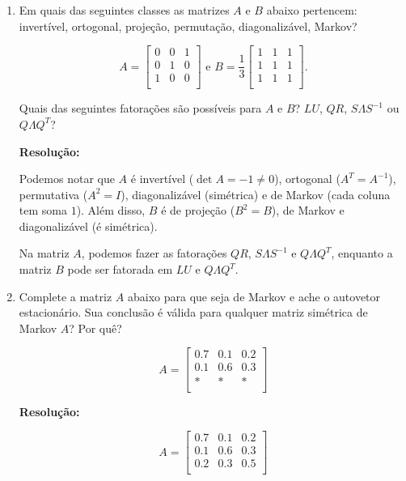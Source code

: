 \documentclass[leqno]{article}
\begin{document}
\begin{enumerate}
    \item Em quais das seguintes classes as matrizes $A$ e $B$ abaixo pertencem: invertível, ortogonal, projeção, permutação, diagonalizável, Markov?
    
    $$A=\begin{bmatrix}
    0 & 0 & 1\\
    0 & 1 & 0\\
    1 & 0 & 0\\
    \end{bmatrix}\text{ e }B=\frac{1}{3}\begin{bmatrix}
    1 & 1 & 1\\
    1 & 1 & 1\\
    1 & 1 & 1\\
    \end{bmatrix}\text{.}$$
    
    Quais das seguintes fatorações são possíveis para $A$ e $B$? $LU$, $QR$, $S\Lambda S^{-1}$ ou $Q\Lambda Q^T$?
    
    \textbf{Resolução:}

    Podemos notar que $A$ é invertível ($\det A=-1\neq0$), ortogonal ($A^T=A^{-1}$), permutativa ($A^2=I$), diagonalizável (simétrica) e de Markov (cada coluna tem soma $1$). Além disso, $B$ é de projeção ($B^2=B$), de Markov e diagonalizável (é simétrica).
    
    Na matriz $A$, podemos fazer as fatorações $QR$, $S\Lambda S^{-1}$ e $Q\Lambda Q^T$, enquanto a matriz $B$ pode ser fatorada em $LU$ e $Q\Lambda Q^T$.
    
    \item Complete a matriz $A$ abaixo para que seja de Markov e ache o autovetor estacionário. Sua conclusão é válida para qualquer matriz simétrica de Markov $A$? Por quê?
    
    $$A=\begin{bmatrix}
    0.7 & 0.1 & 0.2\\
    0.1 & 0.6 & 0.3\\
    * & * & *\\
    \end{bmatrix}$$
    
    \textbf{Resolução:}
    
    $$A=\begin{bmatrix}
        0.7 & 0.1 & 0.2\\
        0.1 & 0.6 & 0.3\\
        0.2 & 0.3 & 0.5\\
    \end{bmatrix}$$
    

\end{enumerate}
\end{document}
